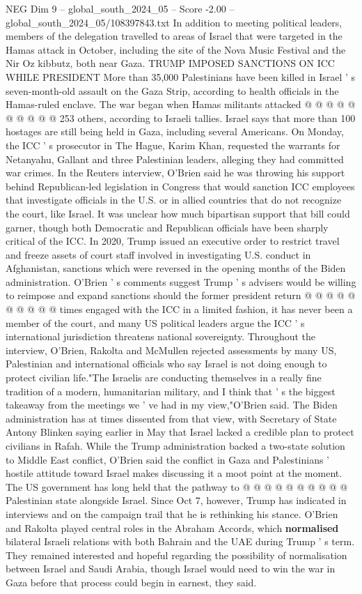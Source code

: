 \begin{textsample}{NEG Dim 9 – global\_south\_2024\_05 – Score -2.00 – global\_south\_2024\_05/108397843.txt}
In addition to meeting political leaders, members of the delegation travelled to areas of Israel that were targeted in the Hamas attack in October, including the site of the Nova Music Festival and the Nir Oz kibbutz, both near Gaza.
TRUMP IMPOSED SANCTIONS ON ICC WHILE PRESIDENT More than 35,000 Palestinians have been killed in Israel ' s seven-month-old assault on the Gaza Strip, according to health officials in the Hamas-ruled enclave.
The war began when Hamas militants attacked @ @ @ @ @ @ @ @ @ @ 253 others, according to Israeli tallies.
Israel says that more than 100 hostages are still being held in Gaza, including several Americans.
On Monday, the ICC ' s prosecutor in The Hague, Karim Khan, requested the warrants for Netanyahu, Gallant and three Palestinian leaders, alleging they had committed war crimes.
In the Reuters interview, O'Brien said he was throwing his support behind Republican-led legislation in Congress that would sanction ICC employees that investigate officials in the U.S. or in allied countries that do not recognize the court, like Israel.
It was unclear how much bipartisan support that bill could garner, though both Democratic and Republican officials have been sharply critical of the ICC.
In 2020, Trump issued an executive order to restrict travel and freeze assets of court staff involved in investigating U.S. conduct in Afghanistan, sanctions which were reversed in the opening months of the Biden administration.
O'Brien ' s comments suggest Trump ' s advisers would be willing to reimpose and expand sanctions should the former president return @ @ @ @ @ @ @ @ @ @ times engaged with the ICC in a limited fashion, it has never been a member of the court, and many US political leaders argue the ICC ' s international jurisdiction threatens national sovereignty.
Throughout the interview, O'Brien, Rakolta and McMullen rejected assessments by many US, Palestinian and international officials who say Israel is not doing enough to protect civilian life."The Israelis are conducting themselves in a really fine tradition of a modern, humanitarian military, and I think that ' s the biggest takeaway from the meetings we ' ve had in my view,"O'Brien said.
The Biden administration has at times dissented from that view, with Secretary of State Antony Blinken saying earlier in May that Israel lacked a credible plan to protect civilians in Rafah.
While the Trump administration backed a two-state solution to Middle East conflict, O'Brien said the conflict in Gaza and Palestinians ' hostile attitude toward Israel makes discussing it a moot point at the moment.
The US government has long held that the pathway to @ @ @ @ @ @ @ @ @ @ Palestinian state alongside Israel.
Since Oct 7, however, Trump has indicated in interviews and on the campaign trail that he is rethinking his stance.
O'Brien and Rakolta played central roles in the Abraham Accords, which \textbf{normalised} bilateral Israeli relations with both Bahrain and the UAE during Trump ' s term.
They remained interested and hopeful regarding the possibility of normalisation between Israel and Saudi Arabia, though Israel would need to win the war in Gaza before that process could begin in earnest, they said.


\end{textsample}
